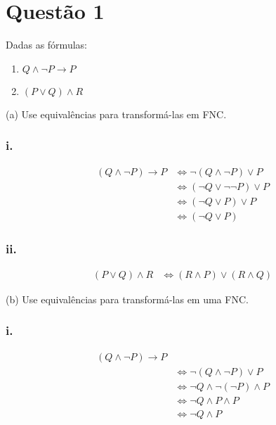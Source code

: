 \section*{Questão 1}

Dadas as fórmulas:

\begin{enumerate}[label=\roman*)]
	\item $Q \land \lnot P \rightarrow P$
	\item $(P \lor Q) \land R$
\end{enumerate}

\noindent
(a) Use equivalências para transformá-las em FNC.

\subsubsection*{i.}

\begin{align*}
	(Q \land \lnot P) \rightarrow P
	 & \Leftrightarrow \lnot (Q \land \lnot P) \lor P      \\[6pt]
	 & \Leftrightarrow (\lnot Q \lor \lnot \lnot P) \lor P \\[6pt]
	 & \Leftrightarrow (\lnot Q \lor P) \lor P             \\[6pt]
	 & \Leftrightarrow (\lnot Q \lor P)
\end{align*}

\subsubsection*{ii.}

\begin{align*}
	(P \lor Q) \land R
	 & \Leftrightarrow (R \land P) \lor (R \land Q)
\end{align*}


\newpage
\noindent
(b) Use equivalências para transformá-las em uma FNC.

\subsubsection*{i.}

\begin{align*}
	(Q \land \lnot P) \rightarrow P                         \\
	 & \Leftrightarrow \lnot (Q \land \lnot P) \lor P       \\
	 & \Leftrightarrow \lnot Q \land \lnot(\lnot P) \land P \\
	 & \Leftrightarrow \lnot Q \land P \land P              \\
	 & \Leftrightarrow \lnot Q \land P
\end{align*}

